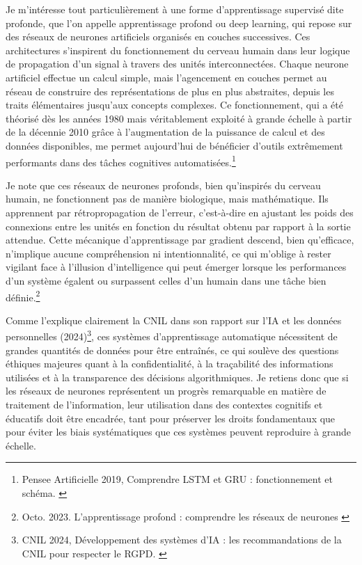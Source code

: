 \documentclass[11pt,a4paper]{report}
\begin{document}
Je m’intéresse tout particulièrement à une forme d’apprentissage supervisé dite profonde, que l’on appelle apprentissage profond ou deep learning, qui repose sur des réseaux de neurones artificiels organisés en couches successives. Ces architectures s’inspirent du fonctionnement du cerveau humain dans leur logique de propagation d’un signal à travers des unités interconnectées. Chaque neurone artificiel effectue un calcul simple, mais l’agencement en couches permet au réseau de construire des représentations de plus en plus abstraites, depuis les traits élémentaires jusqu’aux concepts complexes. Ce fonctionnement, qui a été théorisé dès les années 1980 mais véritablement exploité à grande échelle à partir de la décennie 2010 grâce à l’augmentation de la puissance de calcul et des données disponibles, me permet aujourd’hui de bénéficier d’outils extrêmement performants dans des tâches cognitives automatisées.\footnote{Pensee Artificielle 2019, Comprendre LSTM et GRU : fonctionnement et schéma. \cite{penseeartificielle}}

Je note que ces réseaux de neurones profonds, bien qu’inspirés du cerveau humain, ne fonctionnent pas de manière biologique, mais mathématique. Ils apprennent par rétropropagation de l’erreur, c’est-à-dire en ajustant les poids des connexions entre les unités en fonction du résultat obtenu par rapport à la sortie attendue. Cette mécanique d’apprentissage par gradient descend, bien qu’efficace, n’implique aucune compréhension ni intentionnalité, ce qui m’oblige à rester vigilant face à l’illusion d’intelligence qui peut émerger lorsque les performances d’un système égalent ou surpassent celles d’un humain dans une tâche bien définie.\footnote{Octo. 2023. L'apprentissage profond : comprendre les réseaux de neurones \cite{octo}}

Comme l’explique clairement la CNIL dans son rapport sur l’IA et les données personnelles (2024)\footnote{CNIL 2024, Développement des systèmes d’IA : les recommandations de la CNIL pour respecter le RGPD. \cite{cnil}}, ces systèmes d’apprentissage automatique nécessitent de grandes quantités de données pour être entraînés, ce qui soulève des questions éthiques majeures quant à la confidentialité, à la traçabilité des informations utilisées et à la transparence des décisions algorithmiques. Je retiens donc que si les réseaux de neurones représentent un progrès remarquable en matière de traitement de l’information, leur utilisation dans des contextes cognitifs et éducatifs doit être encadrée, tant pour préserver les droits fondamentaux que pour éviter les biais systématiques que ces systèmes peuvent reproduire à grande échelle.
\end{document}
